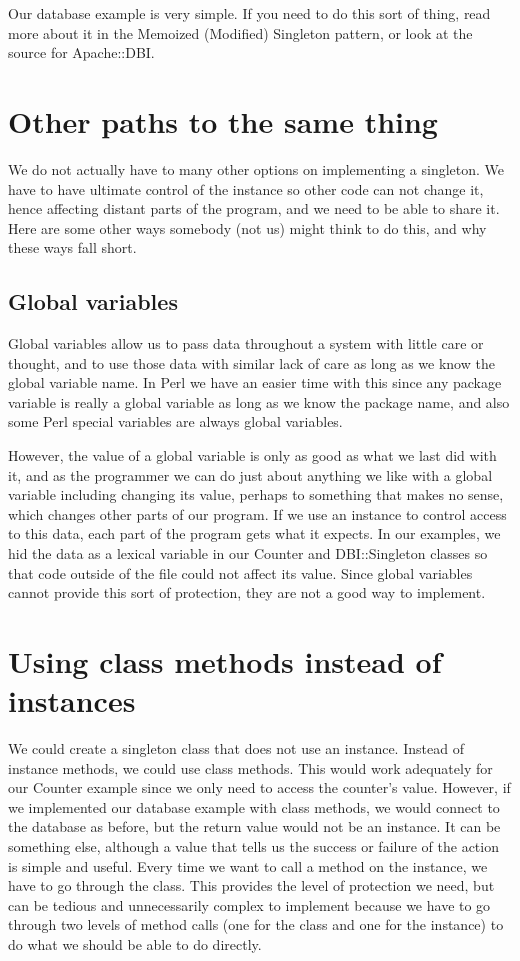 Our database example is very simple.  If you need to do this
sort of thing, read more about it in the Memoized (Modified)
Singleton pattern, or look at the source for Apache::DBI.

    \section{Other paths to the same thing}

We do not actually have to many other options on
implementing a singleton.  We have to have ultimate control
of the instance so other code can not change it, hence
affecting distant parts of the program, and we need to 
be able to share it.  Here are some other ways somebody
(not us) might think to do this, and why these ways fall
short.

        \subsection{Global variables}

Global variables allow us to pass data throughout a system
with little care or thought, and to use those data with
similar lack of care as long as we know the global variable
name.  In Perl we have an easier time with this since any
package variable is really a global variable as long as we know
the package name, and also some
Perl special variables are always global variables.

However, the value of a global variable is only as good as
what we last did with it, and as the programmer we can do
just about anything we like with a global variable including
changing its value, perhaps to something that makes no
sense, which changes other parts of our program.  If we
use an instance to control access to this data, each part of
the program gets what it expects.  In our examples, we hid
the data as a lexical variable in our Counter and DBI::Singleton classes
so that code outside of the file could not affect its value.  Since
global variables cannot provide this sort of protection, they
are not a good way to implement.

    \section{Using class methods instead of instances}
    
We could create a singleton class that does not use an
instance.  Instead of instance methods, we could use class
methods.  This would work adequately for our 
Counter example since we only need to access the counter's value.
However, if we implemented our database example with class
methods, we would connect to the database as before, but the
return value would not be an instance.  It can be something
else, although a value that tells us the success or failure
of the action is simple and useful.  Every time we want to
call a method on the instance, we have to go through the
class.  This provides the level of protection we need, but
can be tedious and unnecessarily complex to implement because
we have to go through two levels of method calls (one for
the class and one for the instance) to do what we should be
able to do directly.

